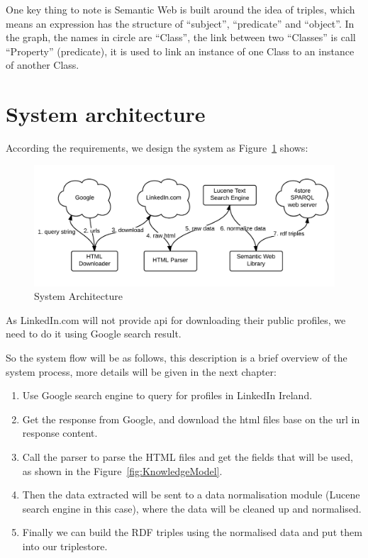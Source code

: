 One key thing to note is Semantic Web is built around the idea of triples, which means an expression has the structure of ``subject'', ``predicate'' and ``object''. In the graph, the names in circle are ``Class'', the link between two ``Classes'' is call ``Property'' (predicate), it is used to link an instance of one Class to an instance of another Class.

\section{System architecture}

According the requirements, we design the system as Figure~\ref{fig:SystemArchitecture} shows:

\begin{figure}[H]
	\centering
	\includegraphics[width=1.0\textwidth]{images/system-architecture.png}
	\caption{System Architecture\protect}
	\label{fig:SystemArchitecture}
\end{figure}


As LinkedIn.com will not provide \gls{api} for downloading their public profiles, we need to do it using Google search result.

So the system flow will be as follows, this description is a brief overview of the system process, more details will be given in the next chapter:
\begin{enumerate}
	\item Use Google search engine to query for profiles in LinkedIn Ireland.
	\item Get the response from Google, and download the html files base on the \gls{url} in response content.
	\item Call the parser to parse the HTML files and get the fields that will be used, as shown in the Figure~\ref{fig:KnowledgeModel}.
	\item Then the data extracted will be sent to a data normalisation module (Lucene search engine in this case), where the data will be cleaned up and normalised.
	\item Finally we can build the RDF triples using the normalised data and put them into our triplestore.
\end{enumerate}


